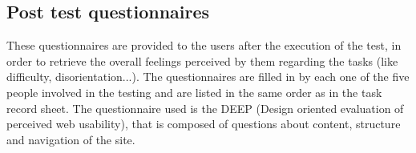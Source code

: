 \newpage
\begin{center}
\end{center}

\newpage
\subsection{Post test questionnaires}
These questionnaires are provided to the users after the execution of the test, in order to retrieve the overall feelings perceived by them regarding the tasks (like difficulty, disorientation...). The questionnaires are filled in by each one of the five people involved in the testing and are listed in the same order as in the task record sheet. The questionnaire used is the DEEP (Design oriented evaluation of perceived web usability), that is composed of questions about content, structure and navigation of the site.

